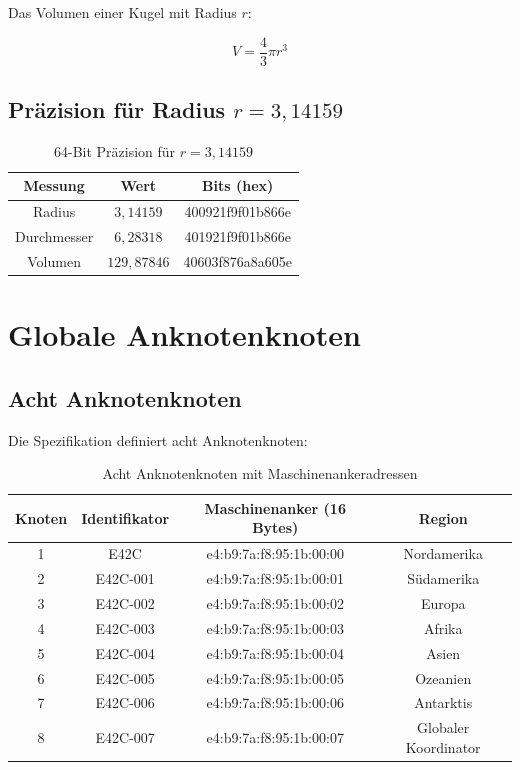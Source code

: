 \documentclass[12pt]{book}
\begin{document}
Das Volumen einer Kugel mit Radius $r$:

\begin{equation}
V = \frac{4}{3} \pi r^3
\end{equation}

\section{Präzision für Radius $r = 3{,}14159$}

\begin{table}[h]
\centering
\begin{tabular}{|c|c|c|}
\hline
\textbf{Messung} & \textbf{Wert} & \textbf{Bits (hex)} \\
\hline
Radius & $3{,}14159$ & 400921f9f01b866e \\
\hline
Durchmesser & $6{,}28318$ & 401921f9f01b866e \\
\hline
Volumen & $129{,}87846$ & 40603f876a8a605e \\
\hline
\end{tabular}
\caption{64-Bit Präzision für $r = 3{,}14159$}
\end{table}

\chapter{Globale Anknotenknoten}

\section{Acht Anknotenknoten}

Die Spezifikation definiert acht Anknotenknoten:

\begin{table}[h]
\centering
\begin{tabular}{|c|c|c|c|}
\hline
\textbf{Knoten} & \textbf{Identifikator} & \textbf{Maschinenanker (16 Bytes)} & \textbf{Region} \\
\hline
1 & E42C & e4:b9:7a:f8:95:1b:00:00 & Nordamerika \\
\hline
2 & E42C-001 & e4:b9:7a:f8:95:1b:00:01 & Südamerika \\
\hline
3 & E42C-002 & e4:b9:7a:f8:95:1b:00:02 & Europa \\
\hline
4 & E42C-003 & e4:b9:7a:f8:95:1b:00:03 & Afrika \\
\hline
5 & E42C-004 & e4:b9:7a:f8:95:1b:00:04 & Asien \\
\hline
6 & E42C-005 & e4:b9:7a:f8:95:1b:00:05 & Ozeanien \\
\hline
7 & E42C-006 & e4:b9:7a:f8:95:1b:00:06 & Antarktis \\
\hline
8 & E42C-007 & e4:b9:7a:f8:95:1b:00:07 & Globaler Koordinator \\
\hline
\end{tabular}
\caption{Acht Anknotenknoten mit Maschinenankeradressen}
\end{table}
\end{document}
